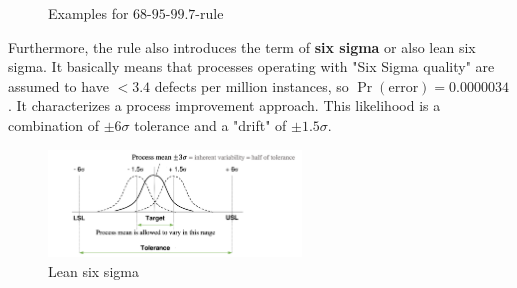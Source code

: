 \begin{figure}[H]
  \centering
  \hspace*{0.05\textwidth}
  \caption{Examples for $68$-$95$-$99.7$-rule}
  \label{fig:2_three_sigma_examples}
\end{figure}

Furthermore, the rule also introduces the term of \textbf{six sigma} or also lean six sigma. It basically means that processes operating with "Six Sigma quality" are assumed to have $< 3.4$ defects per million instances, so $\Pr(\text{error})=0.0000034$. It characterizes a process improvement approach. This likelihood is a combination of $\pm6\sigma$ tolerance and a "drift" of $\pm1.5\sigma$. 

\begin{figure}[H]
  \centering
  \includegraphics[width=0.6\textwidth]{assets/visualization_and_extraction/lean_six_sigma.png}
  \caption{Lean six sigma}
  \label{fig:2_lean_six_sigma}
\end{figure}
